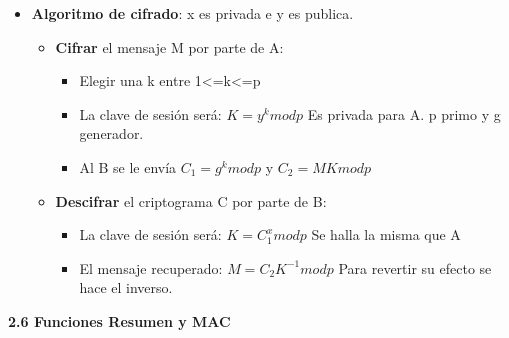 \documentclass[12pt, twoside, openright]{report} %
\begin{document}
  \begin{itemize}
  \item \textbf{Algoritmo de cifrado}: x es privada e y es publica.
    

    \begin{itemize}
    \item \textbf{Cifrar} el mensaje M por parte de A:
      

      \begin{itemize}
      \item Elegir una k entre 1\textless=k\textless=p
        
      \item La clave de sesión será: $K=y^k mod p$ Es privada para A. p
        primo y g generador.
        
      \item Al B se le envía $C_1 = g^k mod p$ y $C_2 = M K mod p$
        
      \end{itemize}
    \item \textbf{Descifrar} el criptograma C por parte de B:
      

      \begin{itemize}
      \item La clave de sesión será: $K=C_1^x mod p$ Se halla la misma que A
        
      \item El mensaje recuperado: $M=C_2 K^{-1} mod p$ Para revertir su
        efecto se hace el inverso.
        
      \end{itemize}
    \end{itemize}
  \end{itemize}

  
  \textbf{2.6 Funciones Resumen y MAC}
  
\end{document}
